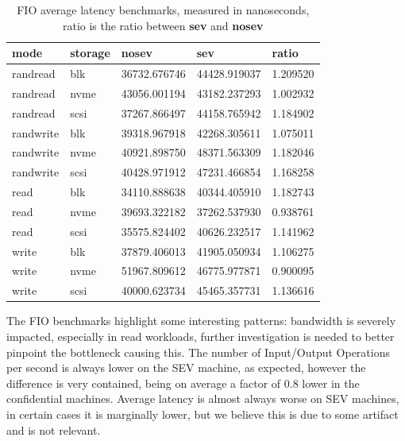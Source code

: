 \documentclass[twocolumn]{article}
\begin{document}
\begin{table}
    \small
    \begin{tabular}{lllll}
        \hline
        \textbf{mode}& \textbf{storage} & \textbf{nosev} & \textbf{sev} & \textbf{ratio} \\
        \hline
        randread     & blk              & 36732.676746   & 44428.919037 & 1.209520       \\
        randread     & nvme             & 43056.001194   & 43182.237293 & 1.002932       \\
        randread     & scsi             & 37267.866497   & 44158.765942 & 1.184902       \\
        randwrite    & blk              & 39318.967918   & 42268.305611 & 1.075011       \\
        randwrite    & nvme             & 40921.898750   & 48371.563309 & 1.182046       \\
        randwrite    & scsi             & 40428.971912   & 47231.466854 & 1.168258       \\
        read         & blk              & 34110.888638   & 40344.405910 & 1.182743       \\
        read         & nvme             & 39693.322182   & 37262.537930 & 0.938761       \\
        read         & scsi             & 35575.824402   & 40626.232517 & 1.141962       \\
        write        & blk              & 37879.406013   & 41905.050934 & 1.106275       \\
        write        & nvme             & 51967.809612   & 46775.977871 & 0.900095       \\
        write        & scsi             & 40000.623734   & 45465.357731 & 1.136616       \\
        \hline
    \end{tabular}
    \caption{FIO average latency benchmarks, measured in nanoseconds, ratio is the ratio between \textbf{sev} and \textbf{nosev}}
    \label{tab:fio-al-ratios}
\end{table}

The FIO benchmarks highlight some interesting patterns: bandwidth is severely impacted, especially in read workloads, further investigation is needed to better pinpoint the bottleneck causing this. The number of Input/Output Operations per second is always lower on the SEV machine, as expected, however the difference is very contained, being on average a factor of 0.8 lower in the confidential machines. Average latency is almost always worse on SEV machines, in certain cases it is marginally lower, but we believe this is due to some artifact and is not relevant.
\end{document}
